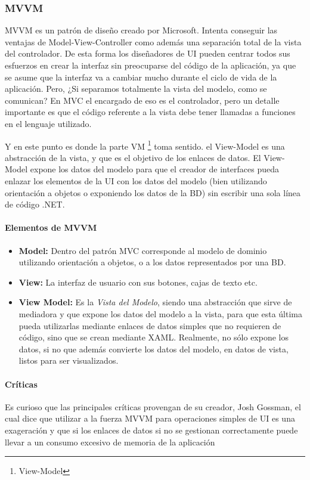 \subsubsection{MVVM}
MVVM es un patr\'{o}n de dise\~{n}o creado por Microsoft. Intenta conseguir las ventajas de Model-View-Controller como adem\'as una separaci\'{o}n total
de la vista del controlador. De esta forma los dise\~{n}adores de UI pueden centrar todos sus esfuerzos en crear la interfaz sin preocuparse 
del c\'{o}digo de la aplicaci\'{o}n, ya que se asume que la interfaz va a cambiar mucho durante el ciclo de vida de la aplicaci\'{o}n. Pero,
¿Si separamos totalmente la vista del modelo, como se comunican? En MVC el encargado de eso es el controlador, pero un detalle importante es 
que el c\'{o}digo referente a la vista debe tener llamadas a funciones en el lenguaje utilizado.

Y en este punto es donde la parte VM \footnote{View-Model} toma sentido. el View-Model es una abstracci\'{o}n de la vista, y que es el objetivo 
de los enlaces de datos. El View-Model expone los datos del modelo para que el creador de interfaces pueda enlazar los elementos de la UI
con los datos del modelo (bien utilizando orientaci\'{o}n a objetos o exponiendo los datos de la BD) sin escribir una sola l\'{i}nea de 
c\'{o}digo .NET.

\paragraph{Elementos de MVVM}

\begin{itemize}
    \item \textbf{Model:} Dentro del patr\'{o}n MVC corresponde al modelo de dominio utilizando orientaci\'{o}n a objetos, o a los datos
    representados por una BD.
    \item \textbf{View:} La interfaz de usuario con sus botones, cajas de texto etc.
    \item \textbf{View Model:} Es la \emph{Vista del Modelo}, siendo una abstracci\'{o}n que sirve de mediadora y que expone los datos
    del modelo a la vista, para que esta \'{u}ltima pueda utilizarlas mediante enlaces de datos simples que no requieren de c\'{o}digo, sino
    que se crean mediante XAML. Realmente, no s\'{o}lo expone los datos, si no que adem\'as convierte los datos del modelo, en datos de vista, listos
    para ser visualizados.
\end{itemize}

\paragraph{Cr\'{i}ticas}
Es curioso que las principales cr\'{i}ticas provengan de su creador, Josh Gossman, el cual dice que utilizar a la fuerza MVVM para operaciones simples
de UI es una exageraci\'{o}n y que si los enlaces de datos si no se gestionan correctamente puede llevar a un consumo excesivo de 
memoria de la aplicaci\'{o}n \cite{MVVM:Criticism}


